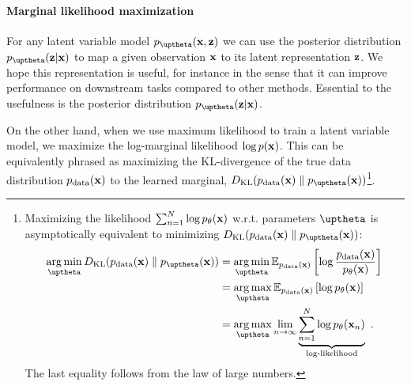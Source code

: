 \paragraph{Marginal likelihood maximization} For any latent variable model $p_{\thetab}(\xb,\zb)$ we can use the posterior distribution $p_{\thetab}(\zb|\xb)$ to map a given observation ${\mathbf{x}}$ to its latent representation ${\mathbf{z}}$. We hope this representation is useful, for instance in the sense that it can improve performance on downstream tasks compared to other methods. Essential to the usefulness is the posterior distribution $p_{\thetab}(\zb|\xb)$. 

On the other hand, when we use maximum likelihood to train a latent variable model, we maximize the log-marginal likelihood $\log p({\mathbf{x}})$. This can be equivalently phrased as maximizing the KL-divergence of the true data distribution $p_{\text{data}}({\mathbf{x}})$ to the learned marginal, $D_{\mathrm{KL}}(p_{\text{data}}(\xb)\parallel p_{\thetab}(\xb))$\footnote{%
Maximizing the likelihood $\sum_{n=1}^N \log p_\theta({\mathbf{x}})$ w.r.t. parameters $\thetab$ is asymptotically equivalent to minimizing $D_{\mathrm{KL}}(p_{\text{data}}(\xb)\parallel p_{\thetab}(\xb))$: 
%
\begin{align}
    \argmin_\thetab D_{\mathrm{KL}}(p_{\text{data}}(\xb)\parallel p_{\thetab}(\xb)) 
    &= \argmin_\thetab \mathbb{E}_{p_{\text{data}}(\xb)} \left[ \log \frac{p_{\text{data}}(\xb)}{p_{\theta}(\xb)} \right] \nonumber \\
    &= \argmax_\thetab \mathbb{E}_{p_{\text{data}}(\xb)} \left[ \log p_{\theta}(\xb) \right] \nonumber \\
    &= \argmax_\thetab \lim_{n\rightarrow\infty} \underset{\text{log-likelihood}}{\underbrace{\sum_{n=1}^N \log p_{\theta}(\xb_n)}} \enspace . \nonumber
\end{align}
%
The last equality follows from the law of large numbers.
}. 
